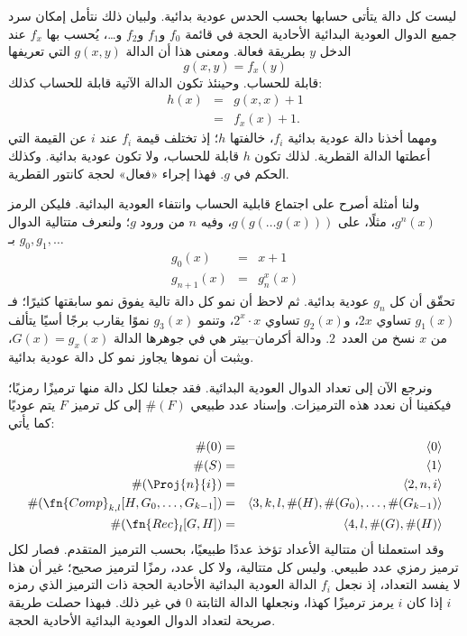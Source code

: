 \documentclass[../../../include/open-logic-section]{subfiles}
\begin{document}

ليست كل دالة يتأتى حسابها بحسب
الحدس عودية بدائية. ولبيان ذلك نتأمل إمكان سرد جميع الدوال
العودية البدائية الأحادية الحجة في قائمة $f_0$ و$f_1$ و$f_2$ و…،
يُحسب بها $f_x$ عند الدخل $y$ بطريقة فعالة. ومعنى هذا
أن الدالة $g(x,y)$ التي تعريفها
\[
g(x,y) = f_x(y)
\]
قابلة للحساب. وحينئذ تكون الدالة الآتية قابلة للحساب كذلك:
\begin{eqnarray*}
h(x) & = & g(x,x) + 1 \\
& = & f_x(x) +1.
\end{eqnarray*}
ومهما أخذنا دالة عودية بدائية $f_i$، خالفتها $h$؛ إذ تختلف قيمة $f_i$ عند $i$ عن القيمة التي أعطتها الدالة القطرية. لذلك
تكون $h$ قابلة للحساب، ولا تكون عودية بدائية. وكذلك الحكم
في $g$. فهذا إجراء «فعال» لحجة كانتور القطرية.

ولنا أمثلة أصرح على اجتماع قابلية الحساب وانتفاء العودية البدائية. فليكن
الرمز $g^n(x)$، مثلًا، على $g(g(\dots g(x)))$، وفيه $n$ من ورود
$g$؛ ولنعرف متتالية الدوال $g_0,g_1,\dots$ بـ
\begin{eqnarray*}
g_0(x) & = & x+1 \\
g_{n + 1}(x) & = & g_n^x(x)
\end{eqnarray*}
تحقّق أن كل $g_n$ عودية بدائية. ثم لاحظ أن نمو كل دالة تالية
يفوق نمو سابقتها كثيرًا؛ فـ$g_1(x)$ تساوي $2x$، و$g_2(x)$ تساوي
$2^x\cdot x$، وتنمو $g_3(x)$ نموًا يقارب برجًا أسيًا يتألف من $x$
نسخ من العدد~$2$. ودالة أكرمان--بيتر هي في جوهرها الدالة $G(x)=g_x(x)$،
ويثبت أن نموها يجاوز نمو كل دالة عودية بدائية.

ونرجع الآن إلى تعداد الدوال العودية البدائية. فقد جعلنا
لكل دالة منها ترميزًا رمزيًا؛ فيكفينا أن نعدد هذه الترميزات.
وإسناد عدد طبيعي $\#(F)$ إلى كل ترميز $F$ يتم عوديًا كما يأتي:
\begin{eqnarray*}
\#(0) & = & \langle 0 \rangle \\
\#(S) & = & \langle 1 \rangle \\
\#(\Proj{n}{i}) & = & \langle 2, n, i \rangle \\
\#(\fn{Comp}_{k,l}[H,G_0,\dots,G_{k-1}]) & = & \langle
3,k,l,\#(H),\#(G_0),\dots,\#(G_{k-1}) \rangle \\
\#(\fn{Rec}_l[G,H]) & = & \langle 4, l, \#(G), \#(H) \rangle
\end{eqnarray*}
وقد استعملنا أن متتالية الأعداد تؤخذ عددًا
طبيعيًا، بحسب الترميز المتقدم. فصار لكل ترميز رمزي
عدد طبيعي. وليس كل متتالية، ولا كل عدد، رمزًا لترميز
صحيح؛ غير أن هذا لا يفسد التعداد، إذ نجعل $f_i$ الدالة العودية البدائية الأحادية
الحجة ذات الترميز الذي رمزه $i$ إذا كان $i$ يرمز ترميزًا كهذا، ونجعلها
الدالة الثابتة $0$ في غير ذلك. فبهذا حصلت طريقة صريحة
لتعداد الدوال العودية البدائية الأحادية الحجة.
\end{document}
